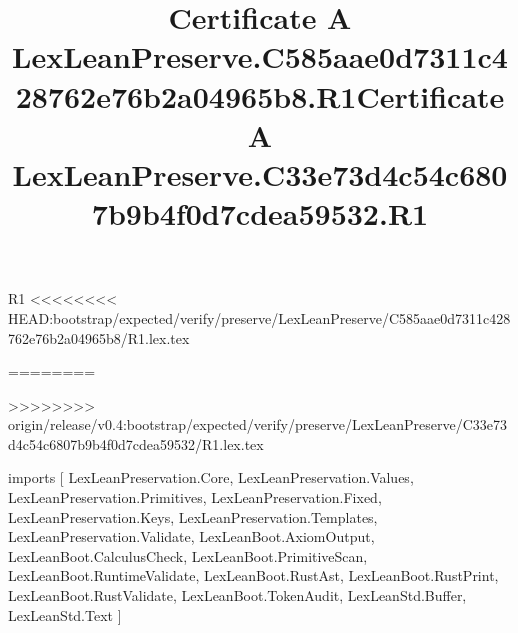 \begin{lexlean}{R1}
<<<<<<<< HEAD:bootstrap/expected/verify/preserve/LexLeanPreserve/C585aae0d7311c428762e76b2a04965b8/R1.lex.tex
\title{Certificate A LexLeanPreserve.C585aae0d7311c428762e76b2a04965b8.R1}
========
\title{Certificate A LexLeanPreserve.C33e73d4c54c6807b9b4f0d7cdea59532.R1}
>>>>>>>> origin/release/v0.4:bootstrap/expected/verify/preserve/LexLeanPreserve/C33e73d4c54c6807b9b4f0d7cdea59532/R1.lex.tex
\begin{coremodule}
imports [
  LexLeanPreservation.Core,
  LexLeanPreservation.Values,
  LexLeanPreservation.Primitives,
  LexLeanPreservation.Fixed,
  LexLeanPreservation.Keys,
  LexLeanPreservation.Templates,
  LexLeanPreservation.Validate,
  LexLeanBoot.AxiomOutput,
  LexLeanBoot.CalculusCheck,
  LexLeanBoot.PrimitiveScan,
  LexLeanBoot.RuntimeValidate,
  LexLeanBoot.RustAst,
  LexLeanBoot.RustPrint,
  LexLeanBoot.RustValidate,
  LexLeanBoot.TokenAudit,
  LexLeanStd.Buffer,
  LexLeanStd.Text
]


\end{coremodule}
\end{lexlean}
